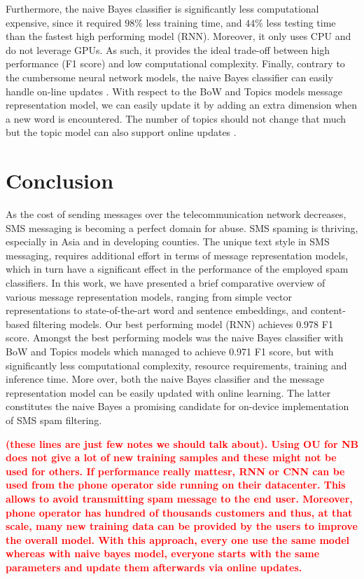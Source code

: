 \documentclass[letterpaper]{article}
\newcommand{\note}[1]{\textbf{\textcolor{red}{#1}}}
\begin{document}
Furthermore, the naive Bayes classifier is significantly less computational expensive, since it required $98\%$ less training time, and $44\%$ less testing time than the fastest high performing model (RNN). Moreover, it only uses CPU and do not leverage GPUs. As such, it provides the ideal trade-off between high performance (F1 score) and low computational complexity. Finally, contrary to the cumbersome neural network models, the naive Bayes classifier can easily handle on-line updates \cite{chan1982updating}. With respect to the BoW and Topics models message representation model, we can easily update it by adding an extra dimension when a new word is encountered. The number of topics should not change that much but the topic model can also support online updates \cite{canini2009online}.

\section{Conclusion} \label{Conclusion}

As the cost of sending messages over the telecommunication network decreases, SMS messaging is becoming a perfect domain for abuse. SMS spaming is thriving, especially in Asia and in developing counties. The unique text style in SMS messaging, requires additional effort in terms of message representation models, which in turn have a significant effect in the performance of the employed spam classifiers. In this work, we have presented a brief comparative overview of various message representation models, ranging from simple vector representations to state-of-the-art word and sentence embeddings, and content-based filtering models. Our best performing model (RNN) achieves 0.978 F1 score. Amongst the best performing models was the naive Bayes classifier with BoW and Topics models which managed to achieve 0.971 F1 score, but with significantly less computational complexity, resource requirements, training and inference time. More over, both the naive Bayes classifier and the message representation model can be easily updated with online learning. The latter constitutes the naive Bayes a promising candidate for on-device implementation of SMS spam filtering.

\note{(these lines are just few notes we should talk about). Using OU for NB does not give a lot of new training samples and these might not be used for others. If performance really mattesr, RNN or CNN can be used from the phone operator side running on their datacenter. This allows to avoid transmitting spam message to the end user. Moreover, phone operator has hundred of thousands customers and thus, at that scale, many new training data can be provided by the users to improve the overall model. With this approach, every one use the same model whereas with naive bayes model, everyone starts with the same parameters and update them afterwards via online updates.}
\end{document}
